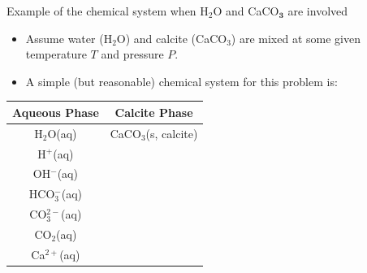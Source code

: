 %
\begin{frame}{Example of the chemical system when H$_{2}$O and CaCO$_{\boldsymbol{3}}$
are involved}
\begin{itemize}
\item Assume water (H$_{2}$O) and calcite (CaCO$_{3}$) are mixed at some
given temperature $T$ and pressure $P$.
\item A simple (but reasonable) chemical system for this problem is:
\end{itemize}
\begin{center}
\begin{tabular}{cc}
\toprule 
\multicolumn{1}{c}{\textbf{Aqueous Phase}} & \textbf{Calcite Phase}\tabularnewline
\midrule
H$_{2}$O(aq) & CaCO$_{3}$(s, calcite)\tabularnewline
H$^{+}$(aq) & \tabularnewline
OH$^{-}$(aq) & \tabularnewline
HCO$_{3}^{-}$(aq) & \tabularnewline
CO$_{3}^{2-}$(aq) & \tabularnewline
CO$_{2}$(aq) & \tabularnewline
Ca$^{2+}$(aq)  & \tabularnewline
\bottomrule
\end{tabular}
\par\end{center}

\end{frame}
%
%
